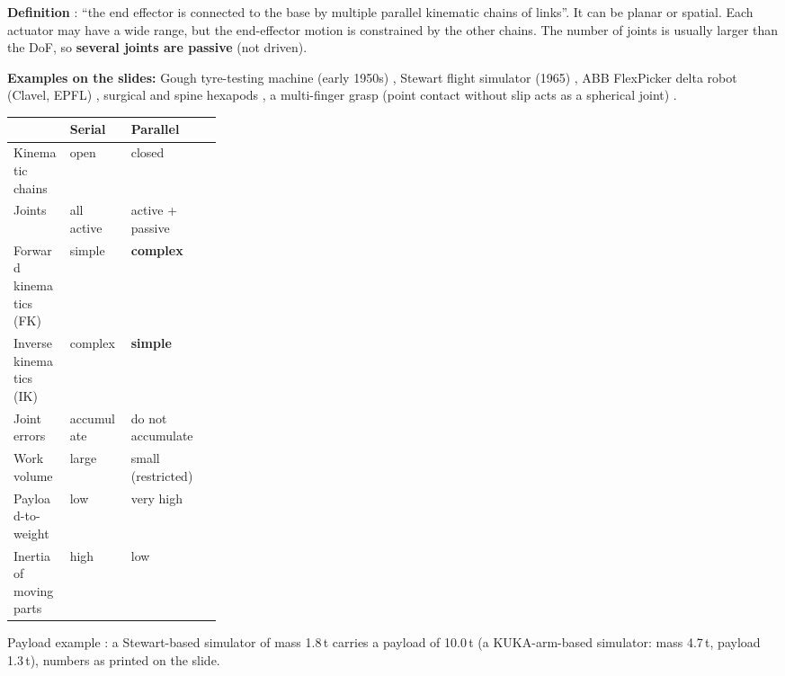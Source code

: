\begin{multicols}{2}

\textbf{Definition} : ``the end effector is connected to the base by multiple parallel kinematic chains of links''. It can be planar or spatial. Each actuator may have a wide range, but the end-effector motion is constrained by the other chains. The number of joints is usually larger than the DoF, so \textbf{several joints are passive} (not driven).

\textbf{Examples on the slides:} Gough tyre-testing machine (early 1950s) , Stewart flight simulator (1965) , ABB FlexPicker delta robot (Clavel, EPFL) , surgical and spine hexapods , a multi-finger grasp (point contact without slip acts as a spherical joint) .

\begin{fbx}
\begin{tabularx}{\linewidth}{@{}p{0.27\linewidth}XX@{}}\toprule
 & \textbf{Serial} & \textbf{Parallel}\\\midrule
Kinematic chains & open & closed\\
Joints & all active & active + passive\\
Forward kinematics (FK) & simple & \textbf{complex}\\
Inverse kinematics (IK) & complex & \textbf{simple}\\
Joint errors & accumulate & do not accumulate\\
Work volume & large & small (restricted)\\
Payload-to-weight & low & very high\\
Inertia of moving parts & high & low\\\bottomrule
\end{tabularx}
\end{fbx}
Payload example : a Stewart-based simulator of mass 1.8\,t carries a payload of 10.0\,t (a KUKA-arm-based simulator: mass 4.7\,t, payload 1.3\,t), numbers as printed on the slide.


\end{multicols}
